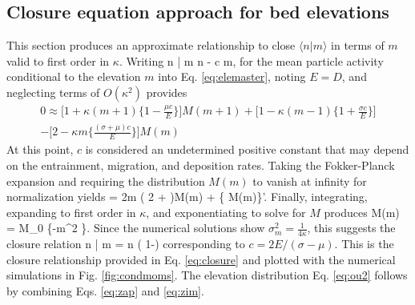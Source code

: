 \subsection{Closure equation approach for bed elevations}
\label{sec:err}
This section produces an approximate relationship to close
$\langle n | m \rangle$ in terms of $m$ valid to first order in $\kappa$. Writing 
\be \langle n | m \rangle \approx \langle n \rangle  - \kappa c m,\ee
for the mean particle activity conditional to the elevation $m$ into Eq. \ref{eq:elemaster}, noting $E=D$, and neglecting terms of $O(\kappa^2)$ provides 
\begin{multline} 0 \approx \Big[ 1+\kappa(m+1)\Big\{ 1-\frac{\mu c}{E}\Big\}\Big]M(m+1) + \Big[1-\kappa(m-1)\Big\{1+\frac{\sigma c}{E}\Big\}\Big]\\-\Big[2-\kappa m\Big\{\frac{(\sigma+\mu)c}{E}\Big\}\Big]M(m)
\end{multline}
At this point, $c$ is considered an undetermined positive constant that may depend on the entrainment, migration, and deposition rates.
Taking the Fokker-Planck expansion and requiring the distribution $M(m)$ to vanish at infinity for normalization yields
 = 2\kappa m \Big( 2 + \Big)M(m) + \Big\{
M(m)\Big\}'.\ee
Finally, integrating, expanding to first order in $\kappa$, and exponentiating to solve for $M$ produces
\be M(m) = M_0 \exp\Big\{-\kappa m^2 \Big\}. \label{eq:zap}\ee
Since the numerical solutions show $\sigma_m^2 = \frac{1}{4\kappa}$, this suggests the closure relation
\be \langle n | m \rangle = \langle n \rangle\Big( 1-\Big) \label{eq:zim}\ee
corresponding to $c=2E/(\sigma-\mu)$. This is the closure relationship provided in Eq. \ref{eq:closure} and plotted with the numerical simulations in Fig. \ref{fig:condmoms}.
The elevation distribution Eq. \ref{eq:ou2} follows by combining Eqs. \ref{eq:zap} and \ref{eq:zim}.

